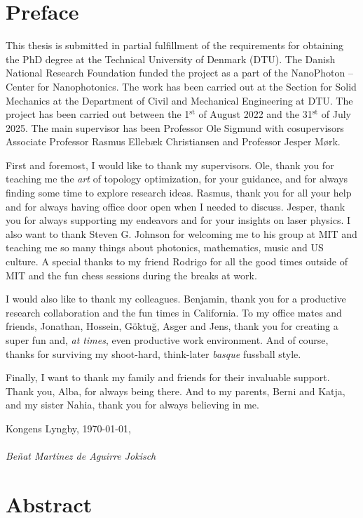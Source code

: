\chapter*{Preface}
This thesis is submitted in partial fulfillment of the requirements for obtaining
the PhD degree at the Technical University of Denmark
(DTU). The Danish National Research Foundation funded the project as a part of
the NanoPhoton -- Center for Nanophotonics. The work has been carried out at the
Section for Solid Mechanics at the Department of Civil and Mechanical Engineering
at DTU. The project has been carried out between the 1$^\text{st}$ of August 2022 and the 31$^\text{st}$
of July 2025. The main supervisor has been Professor Ole Sigmund with cosupervisors Associate Professor Rasmus Ellebæk Christiansen and Professor Jesper
Mørk.

First and foremost, I would like to thank my supervisors. Ole, thank you for teaching me the \emph{art} of topology optimization, for your guidance, and for always
finding some time to explore research ideas. Rasmus, thank you for all your help and for always having office door open when I needed to discuss.
Jesper, thank you for always supporting my endeavors and for your insights on laser physics. I also want to thank Steven G. Johnson for welcoming me to his group at MIT and teaching me so many things about photonics,
mathematics, music and US culture. A special thanks to my friend Rodrigo for all the good times outside of MIT and the fun chess sessions 
during the breaks at work.

I would also like to thank my colleagues. Benjamin, thank you
for a productive research collaboration and the fun times in California. To my office mates and friends, Jonathan, Hossein, Göktuğ, Asger and Jens, thank you for creating 
a super fun and, \emph{at times}, even productive work environment. And of course, thanks for surviving my shoot-hard, think-later \emph{basque} fussball style.


Finally, I want to thank my family and friends for their invaluable support. Thank you, Alba, for always being there. 
And to my parents, Berni and Katja, and my sister Nahia, thank you for always believing in me.

\noindent Kongens Lyngby, \today,\\
\vspace{0.1cm}\\
\noindent \textit{Beñat Martinez de Aguirre Jokisch}

\chapter*{Abstract}


